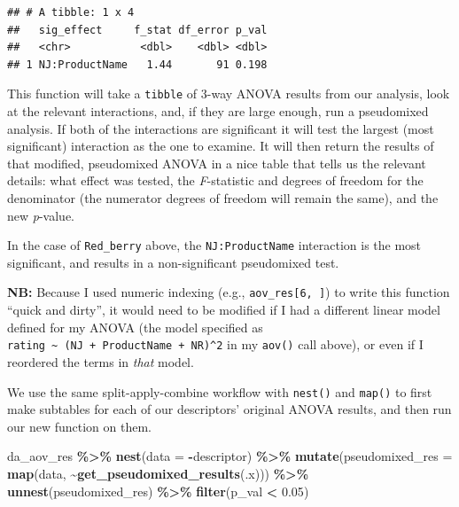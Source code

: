 \documentclass[
]{book}
\newenvironment{Shaded}{\begin{snugshade}}{\end{snugshade}}
\newcommand{\AttributeTok}[1]{\textcolor[rgb]{0.13,0.29,0.53}{#1}}
\newcommand{\FloatTok}[1]{\textcolor[rgb]{0.00,0.00,0.81}{#1}}
\newcommand{\FunctionTok}[1]{\textcolor[rgb]{0.13,0.29,0.53}{\textbf{#1}}}
\newcommand{\NormalTok}[1]{#1}
\newcommand{\SpecialCharTok}[1]{\textcolor[rgb]{0.81,0.36,0.00}{\textbf{#1}}}
\begin{document}
\begin{verbatim}
## # A tibble: 1 x 4
##   sig_effect     f_stat df_error p_val
##   <chr>           <dbl>    <dbl> <dbl>
## 1 NJ:ProductName   1.44       91 0.198
\end{verbatim}

This function will take a \texttt{tibble} of 3-way ANOVA results from our analysis, look at the relevant interactions, and, if they are large enough, run a pseudomixed analysis. If both of the interactions are significant it will test the largest (most significant) interaction as the one to examine. It will then return the results of that modified, pseudomixed ANOVA in a nice table that tells us the relevant details: what effect was tested, the \emph{F}-statistic and degrees of freedom for the denominator (the numerator degrees of freedom will remain the same), and the new \emph{p}-value.

In the case of \texttt{Red\_berry} above, the \texttt{NJ:ProductName} interaction is the most significant, and results in a non-significant pseudomixed test.

\textbf{NB:} Because I used numeric indexing (e.g., \texttt{aov\_res{[}6,\ {]}}) to write this function ``quick and dirty'', it would need to be modified if I had a different linear model defined for my ANOVA (the model specified as \texttt{rating\ \textasciitilde{}\ (NJ\ +\ ProductName\ +\ NR)\^{}2} in my \texttt{aov()} call above), or even if I reordered the terms in \emph{that} model.

We use the same split-apply-combine workflow with \texttt{nest()} and \texttt{map()} to first make subtables for each of our descriptors' original ANOVA results, and then run our new function on them.

\begin{Shaded}
\begin{Highlighting}[]
\NormalTok{da\_aov\_res }\SpecialCharTok{\%\textgreater{}\%}
  \FunctionTok{nest}\NormalTok{(}\AttributeTok{data =} \SpecialCharTok{{-}}\NormalTok{descriptor) }\SpecialCharTok{\%\textgreater{}\%}
  \FunctionTok{mutate}\NormalTok{(}\AttributeTok{pseudomixed\_res =} \FunctionTok{map}\NormalTok{(data, }\SpecialCharTok{\textasciitilde{}}\FunctionTok{get\_pseudomixed\_results}\NormalTok{(.x))) }\SpecialCharTok{\%\textgreater{}\%}
  \FunctionTok{unnest}\NormalTok{(pseudomixed\_res) }\SpecialCharTok{\%\textgreater{}\%}
  \FunctionTok{filter}\NormalTok{(p\_val }\SpecialCharTok{\textless{}} \FloatTok{0.05}\NormalTok{)}
\end{Highlighting}
\end{Shaded}
\end{document}
